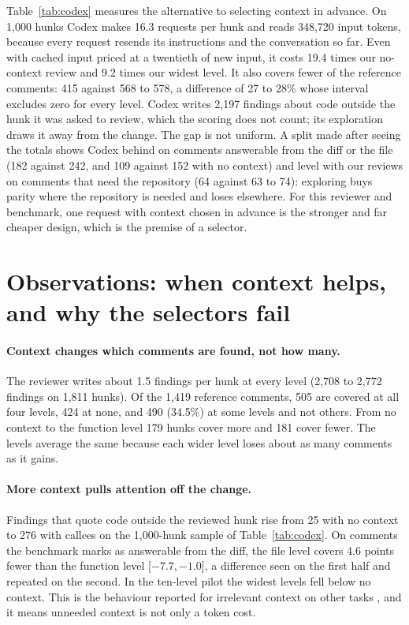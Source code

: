 \documentclass{article}
\newcommand{\ci}[2]{[$#1$,\,$#2$]}
\begin{document}
Table~\ref{tab:codex} measures the alternative to selecting context in advance. On 1,000 hunks Codex makes 16.3 requests per hunk and reads 348,720 input tokens, because every request resends its instructions and the conversation so far. Even with cached input priced at a twentieth of new input, it costs 19.4 times our no-context review and 9.2 times our widest level. It also covers fewer of the reference comments: 415 against 568 to 578, a difference of 27 to 28\% whose interval excludes zero for every level. Codex writes 2,197 findings about code outside the hunk it was asked to review, which the scoring does not count; its exploration draws it away from the change. The gap is not uniform. A split made after seeing the totals shows Codex behind on comments answerable from the diff or the file (182 against 242, and 109 against 152 with no context) and level with our reviews on comments that need the repository (64 against 63 to 74): exploring buys parity where the repository is needed and loses elsewhere. For this reviewer and benchmark, one request with context chosen in advance is the stronger and far cheaper design, which is the premise of a selector.

\section{Observations: when context helps, and why the selectors fail}
\paragraph{Context changes which comments are found, not how many.} The reviewer writes about 1.5 findings per hunk at every level (2,708 to 2,772 findings on 1,811 hunks). Of the 1,419 reference comments, 505 are covered at all four levels, 424 at none, and 490 (34.5\%) at some levels and not others. From no context to the function level 179 hunks cover more and 181 cover fewer. The levels average the same because each wider level loses about as many comments as it gains.

\paragraph{More context pulls attention off the change.} Findings that quote code outside the reviewed hunk rise from 25 with no context to 276 with callees on the 1,000-hunk sample of Table~\ref{tab:codex}. On comments the benchmark marks as answerable from the diff, the file level covers 4.6 points fewer than the function level \ci{-7.7}{-1.0}, a difference seen on the first half and repeated on the second. In the ten-level pilot the widest levels fell below no context. This is the behaviour reported for irrelevant context on other tasks \citep{shi2023distracted}, and it means unneeded context is not only a token cost.
\end{document}
